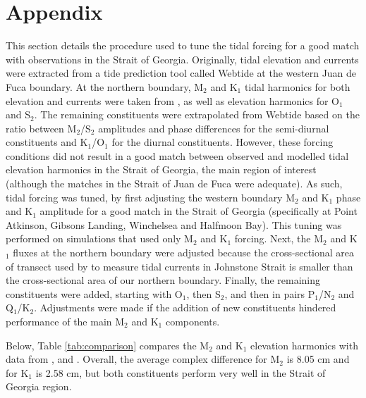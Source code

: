 \documentclass[pdftex,10pt]{article}
\begin{document}
\section{Appendix}\label{sec:appendix}
This section details the procedure used to tune the tidal forcing for a good match with observations in the Strait of Georgia. Originally, tidal elevation and currents were extracted from a tide prediction tool called Webtide \citep{foreman2000webtide} at the western Juan de Fuca boundary. At the northern boundary,  M$_2$ and K$_1$ tidal harmonics for both elevation and currents were taken from \citet{thomson1980johnstone}, as well as elevation harmonics for O$_1$ and S$_2$. The remaining constituents were extrapolated from Webtide based on the ratio between M$_2$/S$_2$ amplitudes and phase differences for the semi-diurnal constituents and K$_1$/O$_1$ for the diurnal constituents. However, these forcing conditions did not result in a good match between observed and modelled tidal elevation harmonics in the Strait of Georgia, the main region of interest (although the matches in the Strait of Juan de Fuca were adequate). As such, tidal forcing was tuned, by first adjusting the western boundary M$_2$ and K$_1$ phase and K$_1$ amplitude for a good match in the Strait of Georgia (specifically at Point Atkinson, Gibsons Landing, Winchelsea and Halfmoon Bay). This tuning was performed on simulations that used only M$_2$ and K$_1$ forcing. Next, the M$_2$ and K$_1$ fluxes at the northern boundary were adjusted because the cross-sectional area of transect used by \citet{thomson1980johnstone} to measure tidal currents in Johnstone Strait is smaller than the cross-sectional area of our northern boundary. Finally, the remaining constituents were added, starting with O$_1$, then S$_2$, and then in pairs P$_1$/N$_2$ and Q$_1$/K$_2$. Adjustments were made if the addition of new constituents hindered performance of the main M$_2$ and K$_1$ components.

Below, Table \ref{tab:comparison} compares the M$_2$ and K$_1$ elevation harmonics with data from \citet{foreman1995tidal}, \citet{foreman2004m} and \citet{foreman2012circulation}. Overall, the average complex difference for M$_2$ is 8.05 cm and for K$_1$ is 2.58 cm, but both constituents perform very well in the Strait of Georgia region. 
\end{document}
